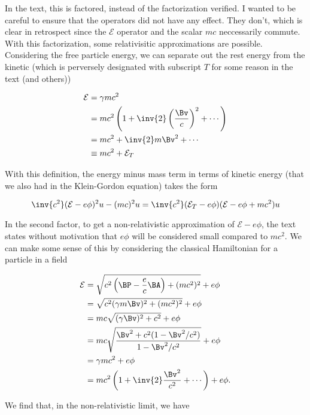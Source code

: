 In the text, this is factored, instead of the factorization verified.  I wanted to be careful to ensure that the operators did not have any effect.  They don't, which is clear in retrospect since the $\mathcal{E}$ operator and the scalar $mc$ neccessarily commute.  With this factorization, some relativisitic approximations are possible.  Considering the free particle energy, we can separate out the rest energy from the kinetic (which is perversely designated with subscript $T$ for some reason in the text (and others))

\begin{align*}
\mathcal{E}
&= \gamma m c^2  \\
&= m c^2 \left( 1 + \inv{2} \left(\frac{\Bv}{c}\right)^2 + \cdots \right) \\
&= m c^2 + \inv{2} m \Bv^2 + \cdots \\
&\equiv m c^2 + \mathcal{E}_{T}
\end{align*}

With this definition, the energy minus mass term in terms of kinetic energy (that we also had in the Klein-Gordon equation) takes the form

\begin{equation}\label{eqn:diracGauge:420}
\inv{c^2} ( \mathcal{E} - e \phi )^2 u - (m c)^2 u
=
\inv{c^2} ( \mathcal{E}_{T} - e \phi ) ( \mathcal{E} - e \phi + m c^2) u
\end{equation}

In the second factor, to get a non-relativistic approximation of $\mathcal{E} - e \phi$, the text states without motivation that $e \phi$ will be considered small compared to $m c^2$.  We can make some sense of this by considering the classical Hamiltonian for a particle in a field

\begin{align*}
\mathcal{E}
&= \sqrt{ c^2 \left(\BP - \frac{e}{c} \BA\right) + (m c^2)^2 } + e \phi \\
&= \sqrt{ c^2 (\gamma m \Bv)^2 + (m c^2)^2 } + e \phi \\
&= m c \sqrt{ (\gamma \Bv)^2 + c^2 } + e \phi \\
&= m c \sqrt{ \frac{ \Bv^2 + c^2 ( 1 - \Bv^2/c^2) } { 1 - \Bv^2/c^2 } } + e \phi \\
&= \gamma m c^2 + e \phi \\
&= m c^2 \left( 1 + \inv{2} \frac{\Bv^2}{c^2} + \cdots \right) + e \phi.
\end{align*}

We find that, in the non-relativistic limit, we have

